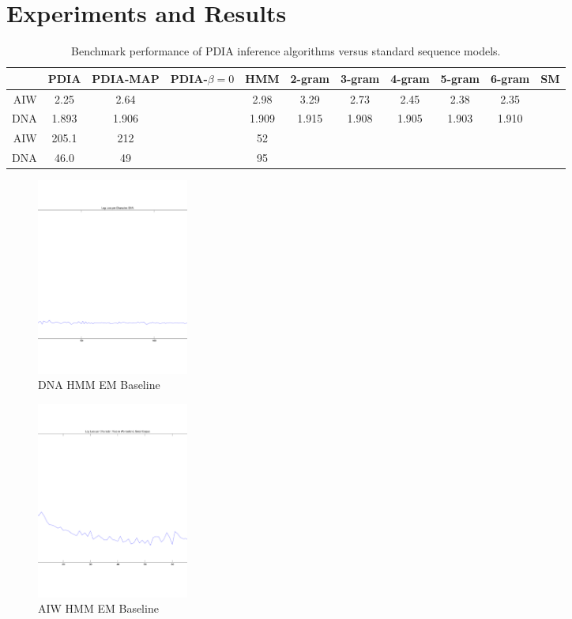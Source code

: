 \section{Experiments and Results}


\begin{table}[t]
    \begin{center}
    \setlength{\tabcolsep}{1.3mm}
\begin{tabular}{r|cccccccccc}
\hline
& {\bf PDIA } & PDIA-MAP & PDIA-$\beta=0$ & HMM & 2-gram& 3-gram & 4-gram & 5-gram & 6-gram & SM \\
\hline
AIW & 2.25 & 2.64 && 2.98 & 3.29 & 2.73 & 2.45 & 2.38 & 2.35 &\\
DNA & 1.893 & 1.906 & & 1.909 & 1.915 & 1.908 & 1.905 & 1.903 & 1.910 & \\
\hline
\hline
AIW & 205.1 & 212 &  & 52 &&&&&&\\
DNA & 46.0 & 49 &  & 95 &&&&&& \\
\hline
\end{tabular}
\end{center}
\caption[Short]{Benchmark performance of PDIA inference algorithms versus standard sequence models.}
\label{table:results}
\end{table}

\begin{figure}[htbp]
\begin{center}
\includegraphics[width=5cm]{results/dna_hmm_baseline}
\caption{DNA HMM EM Baseline}
\label{fig:dna_hmm_baseline}
\end{center}
\end{figure}


\begin{figure}[htbp]
\begin{center}
\includegraphics[width=5cm]{results/aiw_small_hmm_baseline}
\caption{AIW HMM EM Baseline}
\label{fig:aiw_hmm_baseline}
\end{center}
\end{figure}

